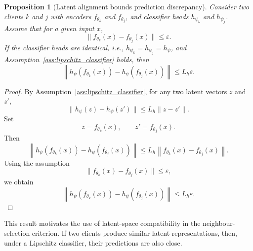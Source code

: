 \documentclass[conference]{IEEEtran}
\newtheorem{proposition}{Proposition}
\begin{document}
\begin{proposition}[Latent alignment bounds prediction discrepancy]
\label{prop:latent_alignment}
Consider two clients $k$ and $j$ with encoders $f_{\theta_k}$ and $f_{\theta_j}$, and classifier heads $h_{\psi_k}$ and $h_{\psi_j}$. Assume that for a given input $x$,
\begin{equation}
\|f_{\theta_k}(x)-f_{\theta_j}(x)\|
\leq
\varepsilon.
    \label{eq:auto-076}
\end{equation}
If the classifier heads are identical, i.e., $h_{\psi_k}=h_{\psi_j}=h_{\psi}$, and Assumption~\ref{ass:lipschitz_classifier} holds, then
\begin{equation}
\left\|
h_{\psi}(f_{\theta_k}(x))
-
h_{\psi}(f_{\theta_j}(x))
\right\|
\leq
L_h\varepsilon.
    \label{eq:auto-077}
\end{equation}
\end{proposition}

\begin{proof}
By Assumption~\ref{ass:lipschitz_classifier}, for any two latent vectors $z$ and $z'$,
\begin{equation}
\|h_{\psi}(z)-h_{\psi}(z')\|
\leq
L_h\|z-z'\|.
    \label{eq:auto-078}
\end{equation}
Set
\begin{equation}
z=f_{\theta_k}(x),
\qquad
z'=f_{\theta_j}(x).
    \label{eq:auto-079}
\end{equation}
Then
\begin{equation}
\left\|
h_{\psi}(f_{\theta_k}(x))
-
h_{\psi}(f_{\theta_j}(x))
\right\|
\leq
L_h
\left\|
f_{\theta_k}(x)-f_{\theta_j}(x)
\right\|.
    \label{eq:auto-080}
\end{equation}
Using the assumption
\begin{equation}
\|f_{\theta_k}(x)-f_{\theta_j}(x)\|
\leq
\varepsilon,
    \label{eq:auto-081}
\end{equation}
we obtain
\begin{equation}
\left\|
h_{\psi}(f_{\theta_k}(x))
-
h_{\psi}(f_{\theta_j}(x))
\right\|
\leq
L_h\varepsilon.
    \label{eq:auto-082}
\end{equation}
\end{proof}

This result motivates the use of latent-space compatibility in the neighbour-selection criterion. If two clients produce similar latent representations, then, under a Lipschitz classifier, their predictions are also close.
\end{document}
